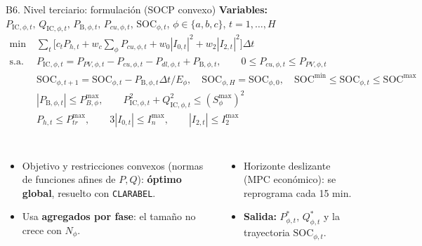 \documentclass[aspectratio=169,10pt,t]{beamer}
\newcommand{\Pic}[1]{P_{\mathrm{IC},#1}}
\newcommand{\Qic}[1]{Q_{\mathrm{IC},#1}}
\newcommand{\PB}[1]{P_{\mathrm{B},#1}}
\newcommand{\SOC}[1]{\mathrm{SOC}_{#1}}
\begin{document}
\begin{frame}{B6. Nivel terciario: formulación (SOCP convexo)}
  \footnotesize
  \textbf{Variables:} $\Pic{\phi,t},\,\Qic{\phi,t},\,\PB{\phi,t},\,P_{cu,\phi,t},\,\SOC{\phi,t}$, \;$\phi\in\{a,b,c\}$, $t=1,\dots,H$
  \begin{align*}
    \min\;& \textstyle\sum_t\Big[c_t P_{h,t}+w_c\sum_\phi P_{cu,\phi,t}+w_0|I_{0,t}|^2+w_2|I_{2,t}|^2\Big]\Delta t\\
    \text{s.a.}\;& \Pic{\phi,t}=P_{PV,\phi,t}-P_{cu,\phi,t}-P_{dl,\phi,t}+\PB{\phi,t},\qquad 0\le P_{cu,\phi,t}\le P_{PV,\phi,t}\\
    & \SOC{\phi,t+1}=\SOC{\phi,t}-\PB{\phi,t}\Delta t/E_\phi,\quad \SOC{\phi,H}=\SOC{\phi,0},\quad \mathrm{SOC}^{\min}\le\SOC{\phi,t}\le\mathrm{SOC}^{\max}\\
    & |\PB{\phi,t}|\le P_{B,\phi}^{\max},\qquad \Pic{\phi,t}^2+\Qic{\phi,t}^2\le (S_\phi^{\max})^2\\
    & P_{h,t}\le P_{tr}^{\max},\qquad 3|I_{0,t}|\le I_n^{\max},\qquad |I_{2,t}|\le I_2^{\max}
  \end{align*}
  \vspace{-6pt}
  \begin{columns}[T,onlytextwidth]
    \begin{itemize}\setlength\itemsep{2pt}
      \item Objetivo y restricciones convexos (normas de funciones afines de $P,Q$): \textbf{óptimo global}, resuelto con \texttt{CLARABEL}.
      \item Usa \textbf{agregados por fase}: el tamaño no crece con $N_\phi$.
    \end{itemize}
    \begin{itemize}\setlength\itemsep{2pt}
      \item Horizonte deslizante (MPC económico): se reprograma cada 15 min.
      \item \textbf{Salida:} $P^*_{\phi,t},\,Q^*_{\phi,t}$ y la trayectoria $\SOC{\phi,t}$.
    \end{itemize}
  \end{columns}
\end{frame}
\end{document}
